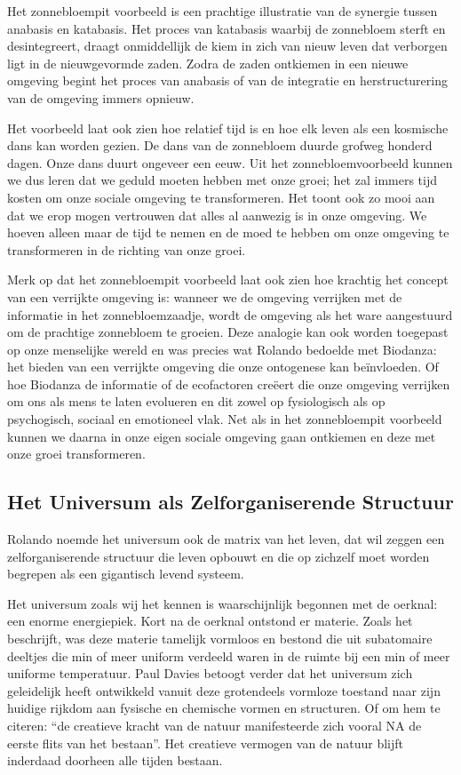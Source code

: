 \documentclass[
  11pt,
]{book}
\begin{document}
Het zonnebloempit voorbeeld is een prachtige illustratie van de synergie tussen anabasis en katabasis. Het proces van katabasis waarbij de zonnebloem sterft en desintegreert, draagt onmiddellijk de kiem in zich van nieuw leven dat verborgen ligt in de nieuwgevormde zaden. Zodra de zaden ontkiemen in een nieuwe omgeving begint het proces van anabasis of van de integratie en herstructurering van de omgeving immers opnieuw.

Het voorbeeld laat ook zien hoe relatief tijd is en hoe elk leven als een kosmische dans kan worden gezien. De dans van de zonnebloem duurde grofweg honderd dagen. Onze dans duurt ongeveer een eeuw. Uit het zonnebloemvoorbeeld kunnen we dus leren dat we geduld moeten hebben met onze groei; het zal immers tijd kosten om onze sociale omgeving te transformeren. Het toont ook zo mooi aan dat we erop mogen vertrouwen dat alles al aanwezig is in onze omgeving. We hoeven alleen maar de tijd te nemen en de moed te hebben om onze omgeving te transformeren in de richting van onze groei.

Merk op dat het zonnebloempit voorbeeld laat ook zien hoe krachtig het concept van een verrijkte omgeving is: wanneer we de omgeving verrijken met de informatie in het zonnebloemzaadje, wordt de omgeving als het ware aangestuurd om de prachtige zonnebloem te groeien. Deze analogie kan ook worden toegepast op onze menselijke wereld en was precies wat Rolando bedoelde met Biodanza: het bieden van een verrijkte omgeving die onze ontogenese kan beïnvloeden. Of hoe Biodanza de informatie of de ecofactoren creëert die onze omgeving verrijken om ons als mens te laten evolueren en dit zowel op fysiologisch als op psychogisch, sociaal en emotioneel vlak. Net als in het zonnebloempit voorbeeld kunnen we daarna in onze eigen sociale omgeving gaan ontkiemen en deze met onze groei transformeren.

\hypertarget{het-universum-als-zelforganiserende-structuur}{%
\subsection{Het Universum als Zelforganiserende Structuur}\label{het-universum-als-zelforganiserende-structuur}}

Rolando noemde het universum ook de matrix van het leven, dat wil zeggen een zelforganiserende structuur die leven opbouwt en die op zichzelf moet worden begrepen als een gigantisch levend systeem.

Het universum zoals wij het kennen is waarschijnlijk begonnen met de oerknal: een enorme energiepiek. Kort na de oerknal ontstond er materie. Zoals \citet{davies1987} het beschrijft, was deze materie tamelijk vormloos en bestond die uit subatomaire deeltjes die min of meer uniform verdeeld waren in de ruimte bij een min of meer uniforme temperatuur. Paul Davies betoogt verder dat het universum zich geleidelijk heeft ontwikkeld vanuit deze grotendeels vormloze toestand naar zijn huidige rijkdom aan fysische en chemische vormen en structuren. Of om hem te citeren: ``de creatieve kracht van de natuur manifesteerde zich vooral NA de eerste flits van het bestaan''. Het creatieve vermogen van de natuur blijft inderdaad doorheen alle tijden bestaan.
\end{document}
